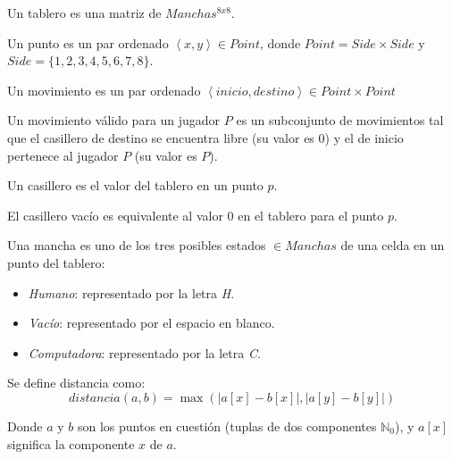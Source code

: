 \documentclass[10pt,a4paper,notitlepage,twocolumn,draft]{article}
\newenvironment{definition}[1][Definición]{\begin{trivlist}
\item[\hskip \labelsep {\bfseries #1}]}{\end{trivlist}}
\begin{document}
\begin{definition}Un tablero es una matriz de $Manchas^{8x8}$.\end{definition}

\begin{definition}
Un punto es un par ordenado $\left\langle x, y\right\rangle \in Point$, donde $Point = Side \times Side$ y $Side = \{1, 2, 3, 4, 5, 6, 7, 8\}$.
\end{definition}

\begin{definition}
Un movimiento es un par ordenado $\left\langle inicio, destino\right\rangle \in Point \times Point$
\end{definition}

\begin{definition}
Un movimiento válido para un jugador $P$ es un subconjunto de movimientos tal que el casillero de destino se encuentra libre (su valor es $0$) y el de inicio pertenece al jugador $P$ (su valor es $P$).
\end{definition}


\begin{definition}
Un casillero es el valor del tablero en un punto $p$.
\end{definition}

\begin{definition}
El casillero vacío es equivalente al valor $0$ en el tablero para el punto $p$.
\end{definition}

\begin{definition}
Una mancha es uno de los tres posibles estados $\in Manchas$ de una celda en un punto del tablero:
\begin{itemize}
\item[-1] \emph{Humano}: representado por la letra \textit{H}.
\item[0] \emph{Vacío}: representado por el espacio en blanco.
\item[1] \emph{Computadora}: representado por la letra \textit{C}.
\end{itemize}
\end{definition}

\begin{definition}
Se define distancia como:
\begin{equation}
    distancia(a, b) = \max(|a[x] - b[x]|, |a[y] - b[y]|)
\end{equation}

Donde $a$ y $b$ son los puntos en cuestión (tuplas de dos componentes $\mathbb{N}_{0}$), y $a[x]$ significa la componente $x$ de $a$.
\end{definition}
\end{document}
